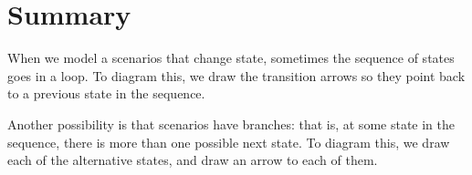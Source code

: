 \documentclass[../../../main.tex]{subfiles}
\begin{document}
\section{Summary}

When we model a scenarios that change state, sometimes the sequence of states goes in a loop. To diagram this, we draw the transition arrows so they point back to a previous state in the sequence.

Another possibility is that scenarios have branches: that is, at some state in the sequence, there is more than one possible next state. To diagram this, we draw each of the alternative states, and draw an arrow to each of them.
\end{document}
